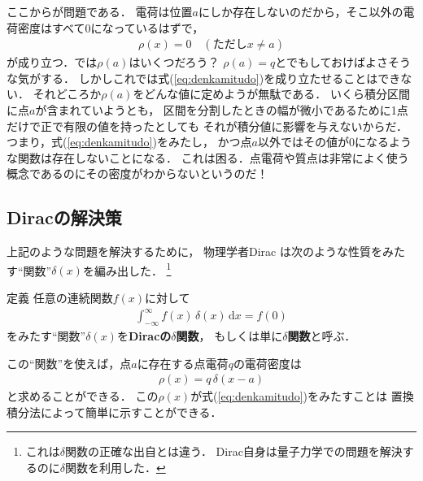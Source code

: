 ここからが問題である．
電荷は位置$a$にしか存在しないのだから，そこ以外の電荷密度はすべて0になっているはずで，
\begin{align*}
\rho ( x) = 0 \quad (\text{ただし$x \neq a$})
\end{align*}
が成り立つ．では$\rho (a)$はいくつだろう？ $\rho (a) = q$とでもしておけばよさそうな気がする．
しかしこれでは式(\ref{eq:denkamitudo})を成り立たせることはできない．
それどころか$\rho(a)$をどんな値に定めようが無駄である．
いくら積分区間に点$a$が含まれていようとも，
区間を分割したときの幅が微小であるために1点だけで正で有限の値を持ったとしても
それが積分値に影響を与えないからだ．
つまり，式(\ref{eq:denkamitudo})をみたし，
かつ点$a$以外ではその値が0になるような関数は存在しないことになる．
これは困る．点電荷や質点は非常によく使う概念であるのにその密度がわからないというのだ！

\subsection{\textrm{Dirac}の解決策}
上記のような問題を解決するために，
物理学者Dirac
は次のような性質をみたす``関数''$\delta (x)$を編み出した．
\footnote{これは$\delta$関数の正確な出自とは違う．
Dirac自身は量子力学での問題を解決するのに$\delta$関数を利用した．}
\begin{itembox}[l]{定義}
任意の連続関数$f(x)$に対して
\begin{align}
\int_{-\infty}^{\infty} f(x) \, \delta (x) \, \mathrm{d}x = f(0)
\label{eq:deltadisdef}
\end{align}
をみたす``関数''$\delta(x)$を\textbf{Diracの$\delta$関数}，
もしくは単に\textbf{$\delta$関数}と呼ぶ．
\end{itembox}
この``関数''を使えば，点$a$に存在する点電荷$q$の電荷密度は
\begin{align}
\rho (x) = q \, \delta ( x-a )
\label{eq:denkamitudodelta}
\end{align}
と求めることができる．
この$\rho(x)$が式(\ref{eq:denkamitudo})をみたすことは
置換積分法によって簡単に示すことができる．

